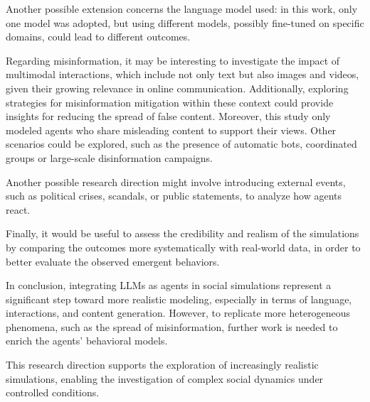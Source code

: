 Another possible extension concerns the language model used: in this work, only one model was adopted, but using different models, possibly fine-tuned on specific domains, could lead to different outcomes.

Regarding misinformation, it may be interesting to investigate the impact of multimodal interactions, which include not only text but also images and videos, given their growing relevance in online communication.
Additionally, exploring strategies for misinformation mitigation within these context could provide insights for reducing the spread of false content.
Moreover, this study only modeled agents who share misleading content to support their views. Other scenarios could be explored, such as the presence of automatic bots, coordinated groups or large-scale disinformation campaigns.

Another possible research direction might involve introducing external events, such as political crises, scandals, or public statements, to analyze how agents react.

Finally, it would be useful to assess the credibility and realism of the simulations by comparing the outcomes more systematically with real-world data, in order to better evaluate the observed emergent behaviors.


\medskip
In conclusion, integrating LLMs as agents in social simulations represent a significant step toward more realistic modeling, especially in terms of language, interactions, and content generation.
However, to replicate more heterogeneous phenomena, such as the spread of misinformation, further work is needed to enrich the agents' behavioral models.

This research direction supports the exploration of increasingly realistic simulations, enabling the investigation of complex social dynamics under controlled conditions. 
